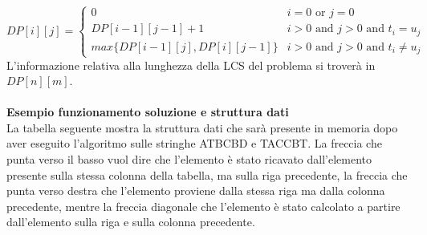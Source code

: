 \documentclass[../cheatSheetAlgoritmi.tex]{subfiles}
\begin{document}
\begin{equation*}
  	DP[i][j] =\begin{cases}
    	0 & \text{$i = 0$ or $j=0$}\\
    	DP[i-1][j-1] + 1 & \text{$i>0$ and $j>0$ and $t_{i} = u_{j}$}\\
    	max \{DP[i-1][j], DP[i][j-1]\} & \text{$i>0$ and $j>0$ and $t_{i} \neq u_{j}$}
    	
  	\end{cases}
\end{equation*}
L'informazione relativa alla lunghezza della LCS del problema si troverà in $DP[n][m]$.\\\\
\textbf{Esempio funzionamento soluzione e struttura dati}\\
La tabella seguente mostra la struttura dati che sarà presente in memoria dopo aver eseguito l'algoritmo sulle stringhe ATBCBD e TACCBT. La freccia che punta verso il basso vuol dire che l'elemento è stato ricavato dall'elemento presente sulla stessa colonna della tabella, ma sulla riga precedente, la freccia che punta verso destra che l'elemento proviene dalla stessa riga ma dalla colonna precedente, mentre la freccia diagonale che l'elemento è stato calcolato a partire dall'elemento sulla riga e sulla colonna precedente. 
\end{document}
